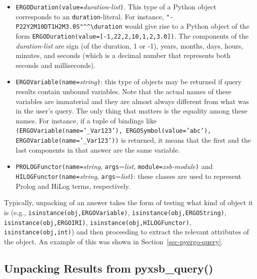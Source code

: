 \begin{itemize}
  A \texttt{\bs{}time} object from \ERGO would give rise to an
  \texttt{ERGODatetime} object in Python in which the \texttt{date}
  component is absent. A \texttt{\bs{}date} object in \ERGO would give rise
  to a \texttt{ERGODatetime} object in which the \texttt{time}-component is
  absent.
\item \texttt{ERGODuration(value=}\emph{duration-list}\texttt{)}.
  This type of a Python object corresponds to an \ERGO
  \texttt{\bs{}duration}-literal. For instance,
  \verb|"-P22Y2M10DT1H2M3.0S"^^\duration| would give rise to a Python
  object of the form
  \texttt{ERGODuration(value=[-1,22,2,10,1,2,3.0])}. The components of the
  \emph{duration-list} are sign (of the duration, 1 or -1), years, months,
  days, hours, minutes, and seconds (which is a decimal number that
  represents both seconds and milliseconds).
\item  \texttt{ERGOVariable(name=}\emph{string}\texttt{)}: this type of
  objects may be returned if query results contain unbound variables.
  Note that the actual names of these variables are immaterial and they are
  almost always different from what was in the user's  query. The only thing that
  matters is the equality among these names. For instance, if a tuple of
  bindings like \texttt{(ERGOVariable(name='\_Var123'), ERGOSymbol(value='abc'),
    ERGOVariable(name='\_Var123'))} is returned, it means that the first and the
  last components in that answer are the same variable.
\item
  \texttt{PROLOGFunctor(name=}\emph{string}, \texttt{args}=\emph{list}, \texttt{module=}\emph{xsb-module}\texttt{)}
  and
  \\
  \texttt{HILOGFunctor(name=}\emph{string}, \texttt{args}=\emph{list}\texttt{)}:
  these classes are used to represent
  Prolog and HiLog terms, respectively.
\end{itemize}
Typically, unpacking of an answer takes the form of testing what kind of
object it is (e.g., \texttt{isinstance(obj,ERGOVariable)},
\texttt{isinstance(obj,ERGOString)},
\texttt{isinstance(obj,ERGOIRI)},
\texttt{isinstance(obj,HILOGFunctor)},
\texttt{isinstance(obj,int)})
and then proceeding to extract the relevant attributes of the object. An
example of this was shown in Section~\ref{sec-pyergo-query}.


\subsection{Unpacking Results from pyxsb\_query()}


